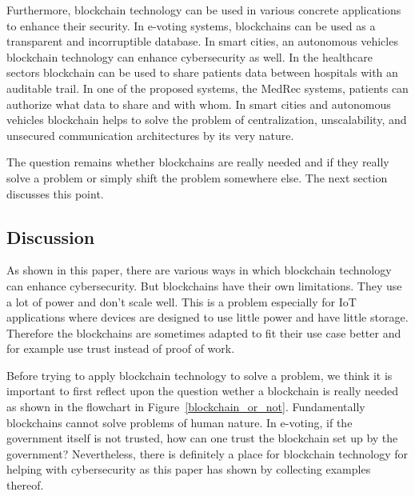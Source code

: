 Furthermore, blockchain technology can be used in various concrete applications to enhance their security.
In e-voting systems, blockchains can be used as a transparent and incorruptible database.
In smart cities, an autonomous vehicles blockchain technology can enhance cybersecurity as well.
In the healthcare sectors blockchain can be used to share patients data between hospitals with an auditable trail. In one of the proposed systems, the MedRec systems, patients can authorize what data to share and with whom.
In smart cities and autonomous vehicles blockchain helps to solve the problem of centralization, unscalability,
and unsecured communication architectures by its very nature.

The question remains whether blockchains are really needed and if they really solve a problem or simply shift the problem somewhere else. The next section discusses this point.

\subsection{Discussion}

As shown in this paper, there are various ways in which blockchain technology can enhance cybersecurity.
But blockchains have their own limitations. They use a lot of power and don't scale well. This is a problem especially for IoT applications where devices are designed to use little power and have little storage. Therefore the blockchains are sometimes adapted to fit their use case better and for example use trust instead of proof of work.

Before trying to apply blockchain technology to solve a problem, we think it is important to first reflect upon the question wether a blockchain is really needed as shown in the flowchart in Figure~\ref{blockchain_or_not}.
Fundamentally blockchains cannot solve problems of human nature. In e-voting, if the government itself is not trusted, how can one trust the blockchain set up by the government? Nevertheless, there is definitely a place for blockchain technology for helping with cybersecurity as this paper has shown by collecting examples thereof.








